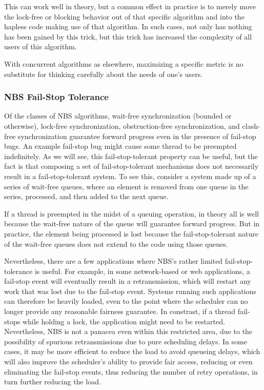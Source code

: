 This can work well in theory, but a common effect in practice is to
merely move the lock-free or blocking behavior out of that specific
algorithm and into the hapless code making use of that algorithm.
In such cases, not only has nothing has been gained by this trick, but
this trick has increased the complexity of all users of this algorithm.

With concurrent algorithms as elsewhere, maximizing a specific metric
is no substitute for thinking carefully about the needs of one's users.

\subsubsection{NBS Fail-Stop Tolerance}
\label{sec:advsync:NBS Fail-Stop Tolerance}

Of the classes of NBS algorithms, wait-free synchronization (bounded or
otherwise), lock-free synchronization, obstruction-free synchronization,
and clash-free synchronization guarantee forward progress even in the
presence of fail-stop bugs.
An example fail-stop bug might cause some thread to be preempted indefinitely.
As we will see, this fail-stop-tolerant property can be useful, but the
fact is that composing a set of fail-stop-tolerant mechanisms does not
necessarily result in a fail-stop-tolerant system.
To see this, consider a system made up of a series of wait-free queues,
where an element is removed from one queue in the series, processed,
and then added to the next queue.

If a thread is preempted in the midst of a queuing operation, in theory
all is well because the wait-free nature of the queue will guarantee
forward progress.
But in practice, the element being processed is lost because the
fail-stop-tolerant nature of the wait-free queues does not extend to
the code using those queues.

Nevertheless, there are a few applications where NBS's rather limited
fail-stop-tolerance is useful.
For example, in some network-based or web applications, a fail-stop
event will eventually result in a retransmission, which will restart
any work that was lost due to the fail-stop event.
Systems running such applications can therefore be heavily loaded, even
to the point where the scheduler can no longer provide any reasonable
fairness guarantee.
In constrast, if a thread fail-stops while holding a lock, the application
might need to be restarted.
Nevertheless, NBS is not a panacea even within this restricted area,
due to the possibility of spurious retransmissions due to pure scheduling
delays.
In some cases, it may be more efficient to reduce the load to avoid
queueing delays, which will also improve the scheduler's ability to
provide fair access, reducing or even eliminating the fail-stop events,
thus reducing the number of retry operations, in turn further reducing
the load.

